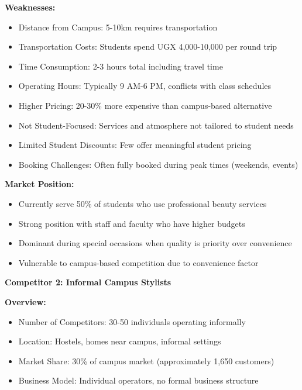 \textbf{Weaknesses:}
\begin{itemize}[leftmargin=2em]
    \item Distance from Campus: 5-10km requires transportation
    \item Transportation Costs: Students spend UGX 4,000-10,000 per round trip
    \item Time Consumption: 2-3 hours total including travel time
    \item Operating Hours: Typically 9 AM-6 PM, conflicts with class schedules
    \item Higher Pricing: 20-30\% more expensive than campus-based alternative
    \item Not Student-Focused: Services and atmosphere not tailored to student needs
    \item Limited Student Discounts: Few offer meaningful student pricing
    \item Booking Challenges: Often fully booked during peak times (weekends, events)
\end{itemize}

\textbf{Market Position:}
\begin{itemize}[leftmargin=2em]
    \item Currently serve 50\% of students who use professional beauty services
    \item Strong position with staff and faculty who have higher budgets
    \item Dominant during special occasions when quality is priority over convenience
    \item Vulnerable to campus-based competition due to convenience factor
\end{itemize}

\vspace{1em}

\textbf{Competitor 2: Informal Campus Stylists}

\textbf{Overview:}
\begin{itemize}[leftmargin=2em]
    \item Number of Competitors: 30-50 individuals operating informally
    \item Location: Hostels, homes near campus, informal settings
    \item Market Share: 30\% of campus market (approximately 1,650 customers)
    \item Business Model: Individual operators, no formal business structure
\end{itemize}

